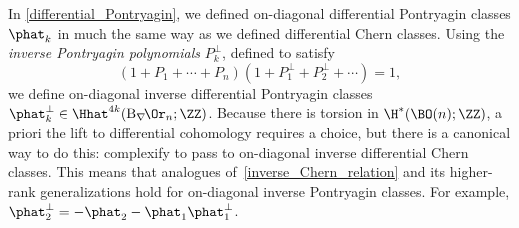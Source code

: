 In \cref{differential_Pontryagin}, we defined on-diagonal differential Pontryagin classes $\phat_k$ in much the
same way as we defined differential Chern classes. Using the \emph{inverse Pontryagin polynomials} $P_k^\perp$,
defined to satisfy 
\begin{equation}
	(1+P_1+\cdots+P_n)(1+P_1^\perp + P_2^\perp + \cdots) = 1,
\end{equation}
we define on-diagonal inverse differential Pontryagin classes $\phat_k^\perp\in \Hhat^{4k}(\mathrm
B_\nabla\!\Or_n;\ZZ)$.  Because there is torsion in $\H^*(\BO(n);\ZZ)$, a priori the lift to differential cohomology
requires a choice, but there is a canonical way to do this: complexify to pass to on-diagonal inverse differential
Chern classes. This means that analogues of~\eqref{inverse_Chern_relation} and its higher-rank generalizations hold
for on-diagonal inverse Pontryagin classes. For example, $\phat_2^\perp = -\phat_2 - \phat_1\phat_1^\perp$.

